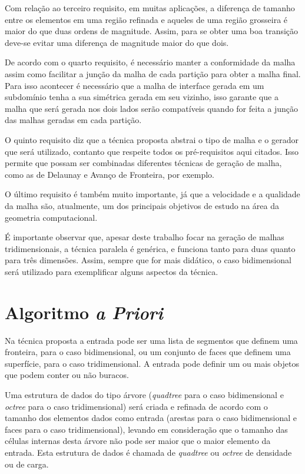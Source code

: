 Com relação ao terceiro requisito, em muitas aplicações, a diferença de tamanho entre os elementos em uma região refinada e aqueles de uma região grosseira é maior do que duas ordens de magnitude. Assim, para se obter uma boa transição deve-se evitar uma diferença de magnitude maior do que dois.

De acordo com o quarto requisito, é necessário manter a conformidade da malha assim como facilitar a junção da malha de cada partição para obter a malha final. Para isso acontecer é necessário que a malha de interface gerada em um subdomínio tenha a sua simétrica gerada em seu vizinho, isso garante que a malha que será gerada nos dois lados serão compatíveis quando for feita a junção das malhas geradas em cada partição.

O quinto requisito diz que a técnica proposta abstrai o tipo de malha e o gerador que será utilizado, contanto que respeite todos os pré-requisitos aqui citados. Isso permite que possam ser combinadas diferentes técnicas de geração de malha, como as de Delaunay e Avanço de Fronteira, por exemplo.

O último requisito é também muito importante, já que a velocidade e a qualidade da malha são, atualmente, um dos principais objetivos de estudo na área da geometria computacional.

É importante observar que, apesar deste trabalho focar na geração de malhas tridimensionais, a técnica paralela é genérica, e funciona tanto para duas quanto para três dimensões. Assim, sempre que for mais didático, o caso bidimensional será utilizado para exemplificar alguns aspectos da técnica.



\section{Algoritmo \textit{a Priori}}

Na técnica proposta a entrada pode ser uma lista de segmentos que definem uma fronteira, para o caso bidimensional, ou um conjunto de faces que definem uma superfície, para o caso tridimensional. A entrada pode definir um ou mais objetos que podem conter ou não buracos. 

Uma estrutura de dados do tipo árvore (\textit{quadtree} para o caso bidimensional e \textit{octree} para o caso tridimensional) será criada e refinada de acordo com o tamanho dos elementos dados como entrada (arestas para o caso bidimensional e faces para o caso tridimensional), levando em consideração que o tamanho das células internas desta árvore não pode ser maior que o maior elemento da entrada. Esta estrutura de dados é chamada de \textit{quadtree} ou \textit{octree} de densidade ou de carga.

